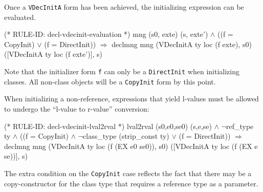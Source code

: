 \documentclass[11pt]{article}
\begin{document}
Once a \texttt{VDecInitA} form has been achieved, the initializing
expression can be evaluated.%
%
\begin{stdrule}
(* RULE-ID: decl-vdecinit-evaluation *)
     mng (s0, exte) (s, exte') \(\land\)
     ((f = CopyInit) \(\lor\) (f = DirectInit))
   \(\Rightarrow\)
     declmng mng (VDecInitA ty loc (f exte), s0)
                 ([VDecInitA ty loc (f exte')], s)
\end{stdrule}
Note that the initializer form \texttt{f} can only be a
\texttt{DirectInit} when initializing classes.  All non-class objects
will be a \texttt{CopyInit} form by this point.

When initializing a non-reference, expressions that yield l-values
must be allowed to undergo the ``l-value to r-value'' conversion:%
%
\begin{stdrule}
(* RULE-ID: decl-vdecinit-lval2rval *)
     lval2rval (s0,e0,se0) (s,e,se) \(\land\)
     \(\neg\)ref_type ty \(\land\)
     ((f = CopyInit) \(\land\) \(\neg\)class_type (strip_const ty) \(\lor\)
      (f = DirectInit))
   \(\Rightarrow\)
     declmng mng (VDecInitA ty loc (f (EX e0 se0)), s0)
                 ([VDecInitA ty loc (f (EX e se))], s)
\end{stdrule}
The extra condition on the \texttt{CopyInit} case reflects the fact
that there may be a copy-constructor for the class type that requires a
reference type as a parameter.
\end{document}
